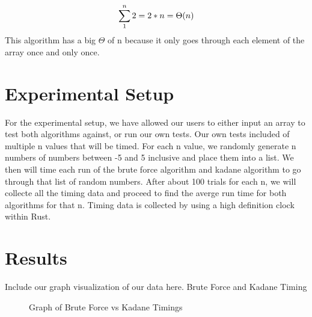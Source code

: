 \documentclass[10pt, letterpaper]{article}
\begin{document}
  \[
  \sum_1^n2 \\
  = 2 * n \\
  = \Theta(n)
		\]
	This algorithm has a big $\Theta$ of n because it only goes through each element of the array once and only once.
	\section{Experimental Setup}
	For the experimental setup, we have allowed our users to either input an array to test both algorithms against, or run our own tests.
  Our own tests included of multiple n values that will be timed. For each n value, we randomly generate n numbers of numbers between -5 and 5 inclusive and place them into a list. We then will time each run of the brute force algorithm and kadane algorithm to go through that list of random numbers. After about 100 trials for each n, we will collecte all the timing data and proceed to find the averge run time for both algorithms for that n.
  Timing data is collected by using a high definition clock within Rust.
	\section{Results}
	Include our graph visualization of our data here. Brute Force and Kadane Timing
	

	\begin{figure}[!htb]
	\caption{
		\label{fig:time-graph} Graph of Brute Force vs Kadane Timings
	}
	\end{figure}

	
\end{document}
